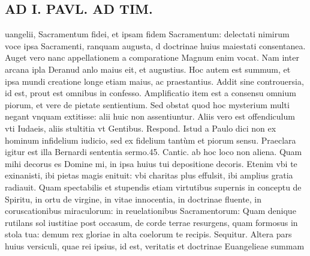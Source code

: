 \documentclass{article}
\begin{document}
\begin{pages}
\section*{AD I. PAVL. AD TIM. }
\marginpar{[ p.170 ]}\pstart uangelii, Sacramentum fidei, et ipsam fidem Sacramentum: delectati nimirum voce ipsa Sacramenti, ranquam augusta, d doctrinae huius maiestati consentanea.  \pend\pstart Auget vero nanc appellationem a comparatione Magnum enim vocat. Nam inter arcana ipla Deranud anlo maius eit, et augustius. Hoc autem est summum, et ipsa mundi creatione longe etiam maius, ac praestantius.  \pend\pstart Addit sine controuersia, id est, prout est omnibus in confesso. Amplificatio item est a consensu omnium piorum, et vere de pietate sentientium. Sed obstat quod hoc mysterium multi negant vnquam extitisse: alii huic non assentiuntur. Aliis vero est offendiculum vti Iudaeis, aliis stultitia vt Gentibus. Respond. Istud a Paulo dici non ex hominum infidelium iudicio, sed ex fidelium tantùm et piorum sensu. Praeclara igitur est illa Bernardi sententia sermo.45. Cantic. ab hoc loco non aliena. Quam mihi decorus es Domine mi, in ipsa huius tui depositione decoris. Etenim vbi te exinanisti, ibi pietas magis enituit: vbi charitas plus effulsit, ibi amplius gratia radiauit. Quam spectabilis et stupendis etiam virtutibus supernis in conceptu de Spiritu, in ortu de virgine, in vitae innocentia, in doctrinae fluente, in coruscationibus miraculorum: in reuelationibus Sacramentorum: Quam denique rutilans sol iustitiae post occasum, de corde terrae resurgens, quam formosus in stola tua: demum rex gloriae in alta coelorum te recipis. Sequitur.  \pend\pstart Altera pars huius versiculi, quae rei ipsius, id est, veritatis et doctrinae Euangelieae summam  \pend

\end{pages}
\end{document}
